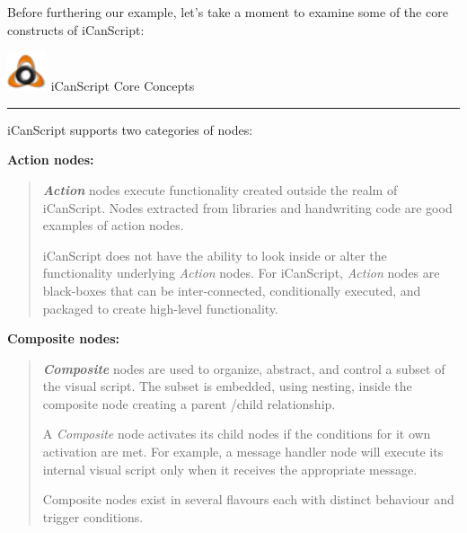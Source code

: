Before furthering our example, let's take a moment to examine some of the core constructs of iCanScript:
\begin{tipbox}

\includegraphics[width=33pt,height=33pt]{iCanScriptLogo_32x32x32.png} {\Large \color{black} iCanScript Core Concepts }

\begin{center}\rule{\textwidth}{0.4pt}\end{center}

iCanScript supports two categories of nodes:

\textbf{Action nodes:}

\begin{quote}

\emph{\textbf{Action}} nodes execute functionality created outside the realm of iCanScript. Nodes extracted from libraries and handwriting code are good examples of action nodes.

iCanScript does not have the ability to look inside or alter the functionality underlying \emph{Action} nodes. For iCanScript, \emph{Action} nodes are black-boxes that can be inter-connected, conditionally executed, and packaged to create high-level functionality.
\end{quote}

\textbf{Composite nodes:}

\begin{quote}

\emph{\textbf{Composite}} nodes are used to organize, abstract, and control a subset of the visual script. The subset is embedded, using nesting, inside the composite node creating a parent \slash  child relationship.

A \emph{Composite} node activates its child nodes if the conditions for it own activation are met. For example, a message handler node will execute its internal visual script only when it receives the appropriate message.

Composite nodes exist in several flavours each with distinct behaviour and trigger conditions.
\end{quote}

\end{tipbox}


